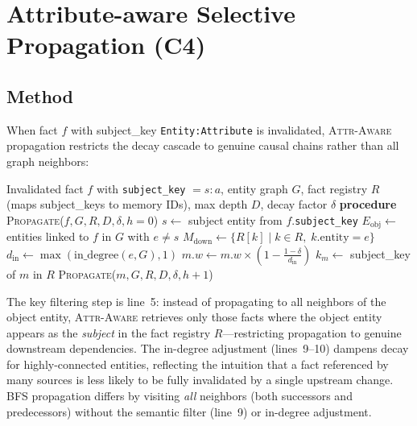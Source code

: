 \documentclass[11pt]{article}
\newcommand{\attraware}{\textsc{Attr-Aware}}
\newcommand{\bfsprop}{\textsc{BFS}}
\begin{document}
\section{Attribute-aware Selective Propagation (C4)}
\label{sec:c4}

\subsection{Method}

When fact $f$ with subject\_key \texttt{Entity:Attribute} is invalidated, \attraware{} propagation restricts the decay cascade to genuine causal chains rather than all graph neighbors:

\begin{algorithm}[htbp]
\caption{\attraware{} Selective Propagation}
\label{alg:attraware}
\begin{algorithmic}[1]
\REQUIRE Invalidated fact $f$ with \texttt{subject\_key} $= s{:}a$, entity graph $G$, fact registry $R$ (maps subject\_keys to memory IDs), max depth $D$, decay factor $\delta$
\STATE \textbf{procedure} \textsc{Propagate}($f, G, R, D, \delta, h{=}0$)
\STATE $s \leftarrow$ subject entity from $f$.\texttt{subject\_key}
\STATE $E_{\text{obj}} \leftarrow$ entities linked to $f$ in $G$ with $e \neq s$ 
  \STATE $M_{\text{down}} \leftarrow \{R[k] \mid k \in R,\; k\text{.entity} = e\}$ 
      \STATE $d_{\text{in}} \leftarrow \max(\text{in\_degree}(e, G), 1)$
      \STATE $m.w \leftarrow m.w \times \left(1 - \frac{1 - \delta}{~d_{\text{in}}~}\right)$
    \ENDIF
  \ENDFOR
      \STATE $k_m \leftarrow$ subject\_key of $m$ in $R$
      \STATE \textsc{Propagate}($m, G, R, D, \delta, h{+}1$) 
    \ENDFOR
  \ENDIF
\ENDFOR
\end{algorithmic}
\end{algorithm}

The key filtering step is line~5: instead of propagating to all neighbors of the object entity, \attraware{} retrieves only those facts where the object entity appears as the \textit{subject} in the fact registry $R$---restricting propagation to genuine downstream dependencies.
The in-degree adjustment (lines~9--10) dampens decay for highly-connected entities, reflecting the intuition that a fact referenced by many sources is less likely to be fully invalidated by a single upstream change.
\bfsprop{} propagation differs by visiting \textit{all} neighbors (both successors and predecessors) without the semantic filter (line~9) or in-degree adjustment.
\end{document}
